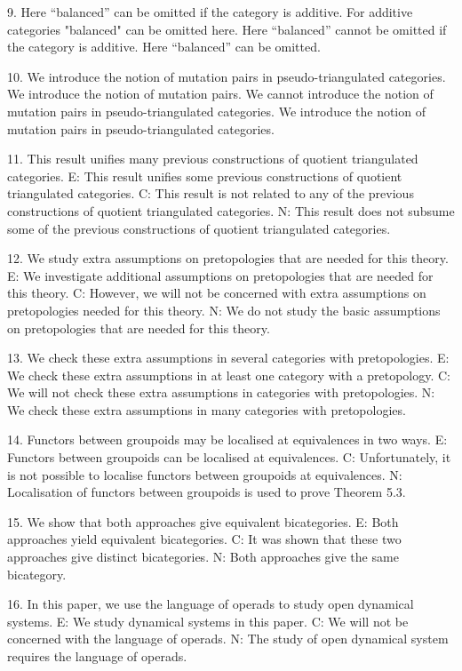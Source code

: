 9. Here ``balanced'' can be omitted if the category is additive.
For additive categories "balanced" can be omitted here.
Here ``balanced'' cannot be omitted if the category is additive.
Here ``balanced'' can be omitted.

10. We introduce the notion of mutation pairs in pseudo-triangulated categories.
We introduce the notion of mutation pairs.
We cannot introduce the notion of mutation pairs in pseudo-triangulated categories.
We introduce the notion of mutation pairs in pseudo-triangulated categories.

11. This result unifies many previous constructions of quotient triangulated categories.
E: This result unifies some previous constructions of quotient triangulated categories.
C: This result is not related to any of the previous constructions of quotient triangulated categories.
N: This result does not subsume some of the previous constructions of quotient triangulated categories.

12. We study extra assumptions on pretopologies that are needed for this theory.
E: We investigate additional assumptions on pretopologies that are needed for this theory.
C: However, we will not be concerned with extra assumptions on pretopologies needed for this theory.
N: We do not study the basic assumptions on pretopologies that are needed for this theory.

13. We check these extra assumptions in several categories with pretopologies.
E: We check these extra assumptions in at least one category with a pretopology.
C: We will not check these extra assumptions in categories with pretopologies.
N: We check these extra assumptions in many categories with pretopologies.

14. Functors between groupoids may be localised at equivalences in two ways.
E: Functors between groupoids can be localised at equivalences.
C: Unfortunately, it is not possible to localise functors between groupoids at equivalences.
N: Localisation of functors between groupoids is used to prove Theorem 5.3.

15. We show that both approaches give equivalent bicategories.
E: Both approaches yield equivalent bicategories.
C: It was shown that these two approaches give distinct bicategories.
N: Both approaches give the same bicategory.

16. In this paper, we use the language of operads to study open dynamical systems.
E: We study dynamical systems in this paper.
C: We will not be concerned with the language of operads.
N: The study of open dynamical system requires the language of operads.

